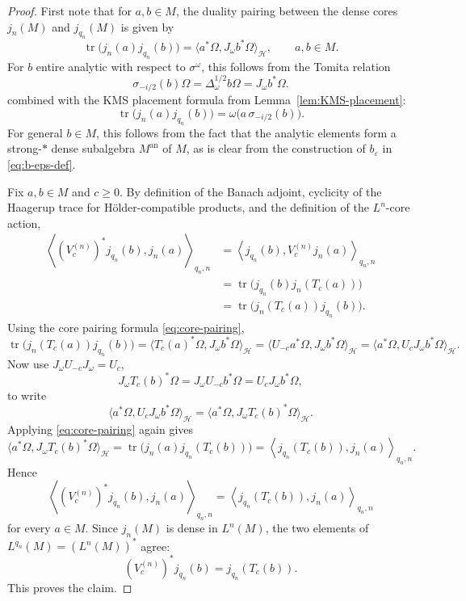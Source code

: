 \documentclass[11pt,a4paper]{article}
\theoremstyle{plain}
\numberwithin{theorem}{section}
\theoremstyle{definition}
\newcommand{\?}{\overset{?}{=}}
\DeclareMathOperator{\tr}{tr}
\newcommand{\ve}{\varepsilon}
\newcommand{\s}{\sigma}
\newcommand{\w}{\omega}
\newcommand{\D}{\Delta}
\newcommand{\W}{\Omega}
\newcommand{\cH}{\mathcal{H}}
\begin{document}
\begin{proof}
First note that for $a,b\in M$, the duality pairing between the dense cores $j_n(M)$ and $j_{q_n}(M)$ is given by
\begin{equation}\label{eq:core-pairing}
    \tr \bigl(j_n(a)j_{q_n}(b)\bigr) = \langle a^*\Omega,J_\omega b^*\Omega\rangle_\cH ,
        \qquad a,b\in M .
\end{equation}
For \(b\) entire analytic with respect to \(\sigma^\omega\), this follows from the Tomita relation
\[
        \s_{-i/2}(b)\W = \D_\w^{1/2}b\W = J_\w b^*\W .       
\] 
combined with the KMS placement formula from Lemma~\ref{lem:KMS-placement}:
\begin{equation*}
    \tr \bigl(j_n(a)j_{q_n}(b)\bigr)=\omega\bigl(a\,\sigma_{-i/2}(b)\bigr).
\end{equation*}
For general $b\in M$, this follows from the fact that the analytic elements form a strong-$*$ dense subalgebra $M^{\text{an}}$ of $M$, as is clear from the construction of $b_\ve$ in \eqref{eq:b-eps-def}.

Fix \(a,b\in M\) and \(c\geq 0\).  By definition of the Banach adjoint,
cyclicity of the Haagerup trace for H\"older-compatible products, and the
definition of the \(L^n\)-core action,
\[
\begin{aligned}
 \left\langle (V_c^{(n)})^*j_{q_n}(b),j_n(a)\right\rangle_{q_n,n}
 &= \left\langle j_{q_n}(b),V_c^{(n)}j_n(a)\right\rangle_{q_n,n}  \\
 &= \tr \bigl(j_{q_n}(b)j_n(T_c(a))\bigr)             \\
 &= \tr \bigl(j_n(T_c(a))j_{q_n}(b)\bigr).
\end{aligned}
\]
Using the core pairing formula \eqref{eq:core-pairing},
\[
        \tr \bigl(j_n(T_c(a))j_{q_n}(b)\bigr)
        =
        \langle T_c(a)^*\Omega,J_\omega b^*\Omega\rangle_\cH 
        =
        \langle U_{-c}a^*\Omega,J_\omega b^*\Omega\rangle_\cH
        =
        \langle a^*\Omega,U_cJ_\omega b^*\Omega\rangle_\cH .
\]
Now use \(J_\omega U_{-c}J_\omega=U_c\),
\[
        J_\omega T_c(b)^*\Omega
        =
        J_\omega U_{-c}b^*\Omega
        =
        U_cJ_\omega b^*\Omega ,
\]
to write
\[
        \langle a^*\Omega,U_cJ_\omega b^*\Omega\rangle_\cH
        =
        \langle a^*\Omega,J_\omega T_c(b)^*\Omega\rangle_\cH .
\]
Applying \eqref{eq:core-pairing} again gives
\[
        \langle a^*\Omega,J_\omega T_c(b)^*\Omega\rangle_\cH
        =
        \tr \bigl(j_n(a)j_{q_n}(T_c(b))\bigr)
        =
        \left\langle j_{q_n}(T_c(b)),j_n(a)\right\rangle_{q_n,n}.
\]
Hence
\[
        \left\langle (V_c^{(n)})^*j_{q_n}(b),j_n(a)\right\rangle_{q_n,n}
        =
        \left\langle j_{q_n}(T_c(b)),j_n(a)\right\rangle_{q_n,n}
\]
for every \(a\in M\).  Since \(j_n(M)\) is dense in \(L^n(M)\), the two
elements of \(L^{q_n}(M)=(L^n(M))^*\) agree:
\[
        (V_c^{(n)})^*j_{q_n}(b)=j_{q_n}(T_c(b)).
\]
This proves the claim.
\end{proof}
\end{document}
